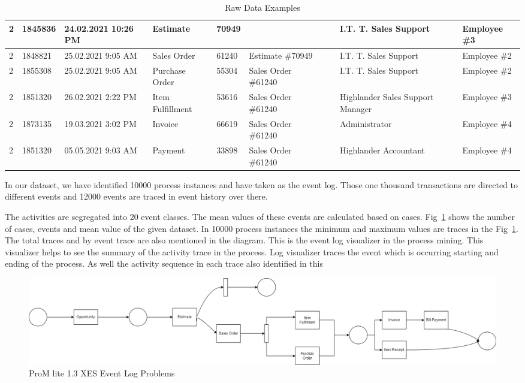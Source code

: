 \begin{table}[htb]
\scriptsize %
\begin{tabularx}{\textwidth}{|X|X|X|X|X|X|X|X|X|X|}
\hline
2&1845836 & 24.02.2021 10:26 PM & Estimate & 70949 &	
 &	 &	& I.T. T. Sales Support &	Employee \#3 \\
\hline
2&1848821 & 25.02.2021 9:05 AM & Sales Order  & 61240 &	Estimate \#70949
 &	 &	& I.T. T. Sales Support &	Employee \#2 \\
\hline
2&1855308 & 25.02.2021 9:05 AM & Purchase Order  & 55304 &	Sales Order \#61240
 &	 &	& I.T. T. Sales Support &	Employee \#2 \\
\hline
2&1851320 & 26.02.2021 2:22 PM & Item Fulfillment  & 53616 &	Sales Order \#61240
 &	 &	& Highlander Sales Support Manager &	Employee \#3 \\
\hline
2&1873135 & 19.03.2021 3:02 PM & Invoice  & 66619 &	Sales Order \#61240
 &	 &	& Administrator &	Employee \#4 \\
\hline
2&1851320 & 05.05.2021 9:03 AM & Payment  & 33898 &	Sales Order \#61240
 &	 &	& Highlander Accountant
 &	Employee \#4 \\
\hline
\end{tabularx}
\caption{Raw Data Examples}
\label{table:datapreprocessed-case2}
\end{table}


In our dataset, we have identified 10000 process instances and have taken as the event log. Those one thousand transactions are directed to different events and 12000 events are traced in event history over there. 

The activities are segregated into 20 event classes. 
The mean values of these events are calculated based on cases. Fig~\ref{figure:promXESEvent} shows the number of cases, events and mean value of the given dataset. In 10000 process instances the minimum and maximum values are traces in the Fig~\ref{figure:promXESEvent}. The total traces and by event trace are also mentioned in the diagram. This is the event log visualizer in the process mining. This visualizer helps to see the summary of the activity trace in the process. Log visualizer traces the event which is occurring starting and ending of the process. As well the activity sequence in each trace also identified in this


\begin{figure}[!htb]
    \centering 
    \includegraphics[scale=0.3]{resource/XESeventLog1.png}
    \caption{ProM lite 1.3 XES Event Log Problems}
    \label{figure:promXESEvent}
\end{figure}


